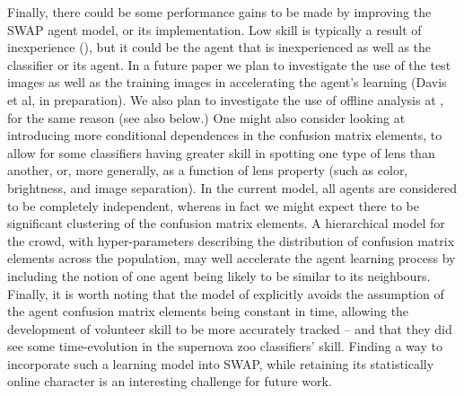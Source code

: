 \documentclass[useAMS,usenatbib,a4paper]{mn2e}
\begin{document}
Finally, there could be some performance gains to be made by improving the
SWAP agent model, or its implementation. Low skill is typically a result  of
inexperience (), but it could be the agent that is
inexperienced as well as the classifier or its agent. In a future paper we
plan to investigate the use of the test images as well as the training images
in accelerating the agent's learning (Davis et al, in preparation). We also
plan to investigate the use of offline analysis at \StageOne, for the same
reason (see also  below.)
One might also consider looking at
introducing more conditional dependences in the confusion matrix elements, to
allow for some classifiers having greater skill in spotting one type of lens
than another, or, more generally, as a function of lens property (such as
color, brightness, and image separation). In the current model, all agents are
considered to be completely independent, whereas in fact we might expect there
to be significant clustering of the confusion matrix elements. A hierarchical
model for the crowd, with hyper-parameters describing the distribution of
confusion matrix elements across the population, may well accelerate the agent
learning process by including the notion of one agent being likely to be
similar to its neighbours. Finally, it is worth noting that the model of
\citet{IBCC} explicitly avoids the assumption of the agent confusion matrix
elements being constant in time, allowing the development of volunteer skill
to be more accurately tracked -- and that they did see some time-evolution in
the supernova zoo classifiers' skill. Finding a way to incorporate such a
learning model into SWAP, while retaining its statistically online character
is an interesting challenge for future work.
\end{document}
